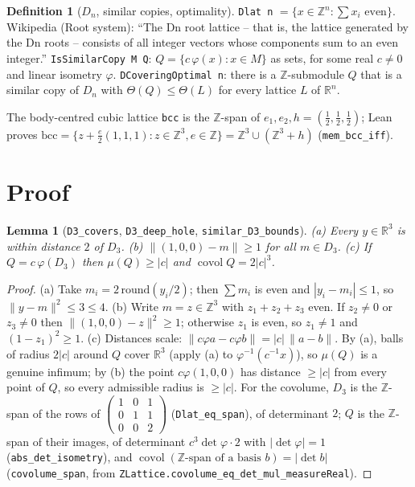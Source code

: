 \documentclass[11pt]{article}
\newtheorem{lemma}[theorem]{Lemma}
\theoremstyle{definition}
\newtheorem{definition}[theorem]{Definition}
\theoremstyle{remark}
\newcommand{\R}{\mathbb{R}}
\newcommand{\Z}{\mathbb{Z}}
\newcommand{\covol}{\operatorname{covol}}
\newcommand{\bcc}{\mathrm{bcc}}
\begin{document}
\begin{definition}[$D_n$, similar copies, optimality]
\texttt{Dlat n} $=\{x\in\Z^n:\sum x_i\text{ even}\}$. Wikipedia (Root system): ``The Dn root lattice
-- that is, the lattice generated by the Dn roots -- consists of all integer vectors whose components
sum to an even integer.'' \texttt{IsSimilarCopy M Q}: $Q=\{c\,\varphi(x):x\in M\}$ as sets, for some
real $c\neq 0$ and linear isometry $\varphi$. \texttt{DCoveringOptimal n}: there is a $\Z$-submodule
$Q$ that is a similar copy of $D_n$ with $\Theta(Q)\le\Theta(L)$ for every lattice $L$ of $\R^n$.
\end{definition}

The body-centred cubic lattice \texttt{bcc} is the $\Z$-span of $e_1,e_2,h=(\tfrac12,\tfrac12,\tfrac12)$;
Lean proves $\bcc=\{z+\tfrac e2(1,1,1): z\in\Z^3, e\in\Z\}=\Z^3\cup(\Z^3+h)$ (\texttt{mem\_bcc\_iff}).

\section{Proof}

\begin{lemma}[\texttt{D3\_covers}, \texttt{D3\_deep\_hole}, \texttt{similar\_D3\_bounds}]\label{lem:D3}
(a) Every $y\in\R^3$ is within distance $2$ of $D_3$. (b) $\|(1,0,0)-m\|\ge 1$ for all $m\in D_3$.
(c) If $Q=c\,\varphi(D_3)$ then $\mu(Q)\ge|c|$ and $\covol Q=2|c|^3$.
\end{lemma}
\begin{proof}
(a) Take $m_i=2\,\mathrm{round}(y_i/2)$; then $\sum m_i$ is even and $|y_i-m_i|\le 1$, so
$\|y-m\|^2\le 3\le 4$. (b) Write $m=z\in\Z^3$ with $z_1+z_2+z_3$ even. If $z_2\ne0$ or $z_3\ne0$ then
$\|(1,0,0)-z\|^2\ge 1$; otherwise $z_1$ is even, so $z_1\ne 1$ and $(1-z_1)^2\ge1$.
(c) Distances scale: $\|c\varphi a-c\varphi b\|=|c|\,\|a-b\|$. By (a), balls of radius $2|c|$ around
$Q$ cover $\R^3$ (apply (a) to $\varphi^{-1}(c^{-1}x)$), so $\mu(Q)$ is a genuine infimum; by (b) the
point $c\varphi(1,0,0)$ has distance $\ge|c|$ from every point of $Q$, so every admissible radius is
$\ge|c|$. For the covolume, $D_3$ is the $\Z$-span of the rows of
$\left(\begin{smallmatrix}1&0&1\\0&1&1\\0&0&2\end{smallmatrix}\right)$ (\texttt{Dlat\_eq\_span}), of
determinant $2$; $Q$ is the $\Z$-span of their images, of determinant $c^3\det\varphi\cdot 2$ with
$|\det\varphi|=1$ (\texttt{abs\_det\_isometry}), and $\covol(\Z\text{-span of a basis }b)=|\det b|$
(\texttt{covolume\_span}, from \texttt{ZLattice.covolume\_eq\_det\_mul\_measureReal}).
\end{proof}
\end{document}
